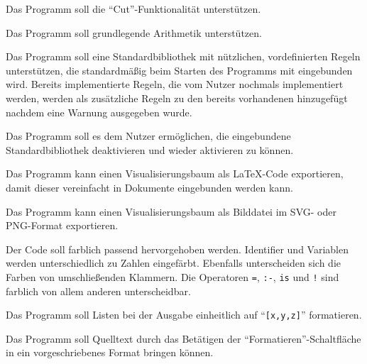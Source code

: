 \documentclass[parskip=full,11pt,twoside]{scrartcl}
\begin{document}

Das Programm soll die \enquote{Cut}-Funktionalität unterstützen.


Das Programm soll grundlegende Arithmetik unterstützen.


Das Programm soll eine Standardbibliothek mit nützlichen, vordefinierten Regeln unterstützen, die standardmäßig beim Starten des Programms mit eingebunden wird. Bereits implementierte Regeln, die vom Nutzer nochmals implementiert werden, werden als zusätzliche Regeln zu den bereits vorhandenen hinzugefügt nachdem eine Warnung ausgegeben wurde.


Das Programm soll es dem Nutzer ermöglichen, die eingebundene Standardbibliothek deaktivieren und wieder aktivieren zu können.


Das Programm kann einen Visualisierungsbaum als LaTeX-Code exportieren, damit dieser vereinfacht in Dokumente eingebunden werden kann.


Das Programm kann einen Visualisierungsbaum als Bilddatei im SVG- oder PNG-Format exportieren.


Der Code soll farblich passend hervorgehoben werden. Identifier und Variablen werden unterschiedlich zu Zahlen eingefärbt. Ebenfalls unterscheiden sich die Farben von umschließenden Klammern. Die Operatoren \texttt{=}, \texttt{:-}, \texttt{is} und \texttt{!} sind farblich von allem anderen unterscheidbar.


Das Programm soll Listen bei der Ausgabe einheitlich auf \enquote{\texttt{[x,y,z]}} formatieren.


Das Programm soll Quelltext durch das Betätigen der \enquote{Formatieren}-Schaltfläche in ein vorgeschriebenes Format bringen können.
\end{document}
